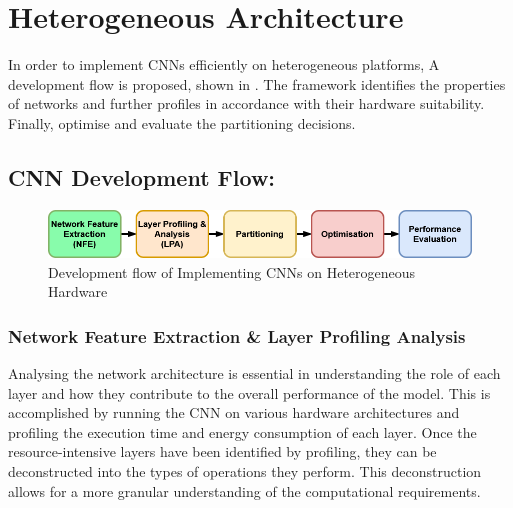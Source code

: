 

\section{Heterogeneous Architecture}
In order to implement CNNs efficiently on heterogeneous platforms, A development flow is proposed, shown in . The framework identifies the properties of networks and further profiles in accordance with their hardware suitability. Finally, optimise and evaluate the partitioning decisions. 


\subsection{CNN Development Flow:}\label{CNNDevflow}
\begin{figure}[t]
\centering
  \includegraphics[width=\columnwidth]{Images/Framework.png}
    \caption[CNN Development Flow]{Development flow of Implementing CNNs on Heterogeneous Hardware}
    \label{fig:Framework}
\end{figure}

\subsubsection{Network Feature Extraction \& Layer Profiling Analysis}
Analysing the network architecture is essential in understanding the role of each layer and how they contribute to the overall performance of the model. This is accomplished by running the CNN on various hardware architectures and profiling the execution time and energy consumption of each layer. Once the resource-intensive layers have been identified by profiling, they can be deconstructed into the types of operations they perform. This deconstruction allows for a more granular understanding of the computational requirements.

